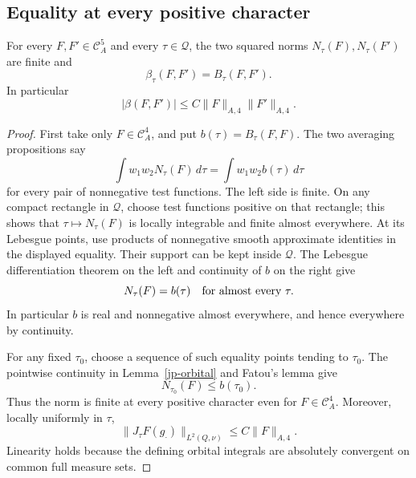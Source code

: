 \subsection{Equality at every positive character}

\begin{theorem}\label{jp-pairing-equality}
For every \(F,F'\in\mathcal C_A^5\) and every
\(\tau\in\mathcal Q\), the two squared norms
\(N_\tau(F),N_\tau(F')\) are finite and
\begin{equation}\label{jp-beta-equals}
                         \beta_\tau(F,F')=B_\tau(F,F').
\end{equation}
In particular
\[
       |\beta(F,F')|\leq C\|F\|_{A,4}\|F'\|_{A,4}.
\]
\end{theorem}

\begin{proof}
First take only \(F\in\mathcal C_A^4\), and put
\(b(\tau)=B_\tau(F,F)\).
The two averaging propositions say
\[
       \int w_1w_2N_\tau(F)\,d\tau=\int w_1w_2b(\tau)\,d\tau
\]
for every pair of nonnegative test functions.
The left side is finite.
On any compact rectangle in \(\mathcal Q\), choose test
functions positive on that rectangle; this shows that
\(\tau\mapsto N_\tau(F)\) is locally integrable and finite
almost everywhere.
At its Lebesgue points, use products of nonnegative smooth
approximate identities in the displayed equality.
Their support can be kept inside \(\mathcal Q\).
The Lebesgue differentiation theorem on the left and continuity
of \(b\) on the right give
\[
                           N_\tau(F)=b(\tau)
                           \quad\hbox{for almost every }\tau .
\]
In particular \(b\) is real and nonnegative almost everywhere,
and hence everywhere by continuity.

For any fixed \(\tau_0\), choose a sequence of such equality
points tending to \(\tau_0\).
The pointwise continuity in Lemma~\ref{jp-orbital} and
Fatou's lemma give
\begin{equation}\label{jp-diagonal-domination}
                    N_{\tau_0}(F)\leq b(\tau_0).
\end{equation}
Thus the norm is finite at every positive character even
for \(F\in\mathcal C_A^4\).  Moreover, locally uniformly in
\(\tau\),
\[
              \|J_\tau F(g_\cdot)\|_{L^2(Q,\nu)}
                                      \leq C\|F\|_{A,4}.
\]
Linearity holds because the defining orbital integrals are
absolutely convergent on common full measure sets.


\end{proof}
